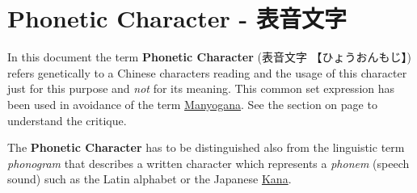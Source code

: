 \section{Phonetic Character - 表音文字} \label{sec:PhoneticCharacter}

In this document the term \textbf{Phonetic Character} ({表音文字}
{【ひょうおんもじ】}) refers genetically to a Chinese characters reading and
the usage of this character just for this purpose and \textit{not} for its
meaning. This common set expression has been used in avoidance of the term
\hyperref[sec:Manyogana]{Manyogana}. See the section  on
page \pageref{sec:Manyogana} to understand the critique.

The \textbf{Phonetic Character} has to be distinguished also from the
linguistic term \textit{phonogram} that describes a written character which
represents a \textit{phonem} (speech sound) such as the Latin alphabet or the
Japanese \hyperref[sec:Kana]{Kana}. 

